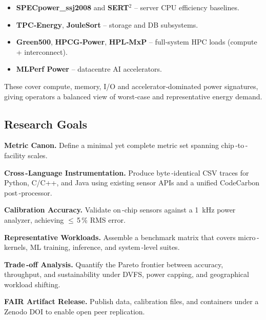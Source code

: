 

\begin{itemize}
  \item \textbf{SPECpower\_ssj2008} and \textbf{SERT$^{2}$}
        – server CPU efficiency baselines.
  \item \textbf{TPC‑Energy}, \textbf{JouleSort}
        – storage and DB subsystems.
  \item \textbf{Green500}, \textbf{HPCG‑Power}, \textbf{HPL‑MxP}
        – full‑system HPC loads (compute + interconnect).
  \item \textbf{MLPerf Power} – datacentre AI accelerators.
\end{itemize}

These cover compute, memory, I/O and accelerator‑dominated power
signatures, giving operators a balanced view of worst‑case and
representative energy demand.




\subsection{Research Goals}
\label{sec:energy:goals}



\begin{goal}
    \item \textbf{Metric Canon.} Define a minimal yet complete metric set spanning chip\,-to\,-facility scales.
    \item \textbf{Cross\,-Language Instrumentation.} Produce byte\,-identical CSV traces for Python, C/C++, and Java using existing sensor APIs and a unified CodeCarbon post\,-processor.
    \item \textbf{Calibration Accuracy.} Validate on\,-chip sensors against a \SI{1}{\kilo\hertz} power analyzer, achieving $\leq$\,5\,\% RMS error.
    \item \textbf{Representative Workloads.} Assemble a benchmark matrix that covers micro\,-kernels, ML training, inference, and system\,-level suites.
    \item \textbf{Trade\,-off Analysis.} Quantify the Pareto frontier between accuracy, throughput, and sustainability under DVFS, power capping, and geographical workload shifting.
    \item \textbf{FAIR Artifact Release.} Publish data, calibration files, and containers under a Zenodo DOI to enable open peer replication.
\end{goal}

